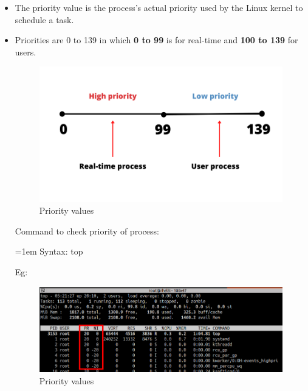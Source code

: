 \setlength{\columnsep}{3pt}
\begin{flushleft}


\begin{itemize}
	\item The priority value is the process’s actual priority used by the Linux kernel to schedule a task.
	\item Priorities are 0 to 139 in which \textbf{0 to 99} is for real-time and \textbf{100 to 139} for users.
	\begin{figure}[h!]
		\centering
		\includegraphics[scale=.4]{content/chapter12/images/pr.png}
		\caption{Priority values}
		\label{fig:cpu5}
	\end{figure}

	Command to check priority of process:
	\bigskip
	\begin{tcolorbox}[breakable,notitle,boxrule=-0pt,colback=pink,colframe=pink]
		\color{black}
		\font=1em
		Syntax: top
		\font=4pt
	\end{tcolorbox}	
	Eg:
	\begin{figure}[h!]
		\centering
		\includegraphics[scale=.32]{content/chapter12/images/nice_1.png}
		\caption{Priority values}
		\label{fig:cpu5}
	\end{figure}
		
	
\end{itemize}


\end{flushleft}
